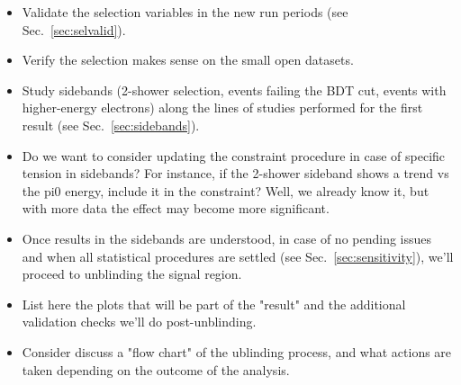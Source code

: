 \documentclass{article}
\begin{document}
\begin{itemize}
    \item Validate the selection variables in the new run periods (see Sec.~\ref{sec:selvalid}).
    \item Verify the selection makes sense on the small open datasets.
    \item Study sidebands (2-shower selection, events failing the BDT cut, events with higher-energy electrons) along the lines of studies performed for the first result (see Sec.~\ref{sec:sidebands}).
    \item Do we want to consider updating the constraint procedure in case of specific tension in sidebands? For instance, if the 2-shower sideband shows a trend vs the pi0 energy, include it in the constraint? Well, we already know it, but with more data the effect may become more significant.
    \item Once results in the sidebands are understood, in case of no pending issues and when all statistical procedures are settled (see Sec.~\ref{sec:sensitivity}), we'll proceed to unblinding the signal region. 
    \item List here the plots that will be part of the "result" and the additional validation checks we'll do post-unblinding.
    \item Consider discuss a "flow chart" of the ublinding process, and what actions are taken depending on the outcome of the analysis.
\end{itemize}
\end{document}
